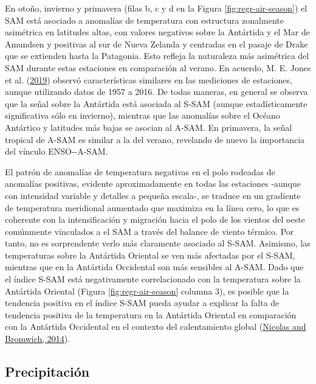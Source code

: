 \documentclass[12pt,oneside,a4paper]{reedthesis}
\begin{document}
En otoño, invierno y primavera (filas b, c y d en la Figura \ref{fig:regr-air-season}) el SAM está asociado a anomalías de temperatura con estructura zonalmente asimétrica en latitudes altas, con valores negativos sobre la Antártida y el Mar de Amundsen y positivas al sur de Nueva Zelanda y centradas en el pasaje de Drake que se extienden hasta la Patagonia.
Esto refleja la naturaleza más asimétrica del SAM durante estas estaciones en comparación al verano.
En acuerdo, M. E. Jones et al. (\protect\hyperlink{ref-jones2019}{2019}) observó características similares en las mediciones de estaciones, aunque utilizando datos de 1957 a 2016.
De todas maneras, en general se observa que la señal sobre la Antártida está asociada al S-SAM (aunque estadísticamente significativa sólo en invierno), mientras que las anomalías sobre el Océano Antártico y latitudes más bajas se asocian al A-SAM.
En primavera, la señal tropical de A-SAM es similar a la del verano, revelando de nuevo la importancia del vínculo ENSO-\/-A-SAM.

El patrón de anomalías de temperatura negativas en el polo rodeadas de anomalías positivas, evidente aproximadamente en todas las estaciones -aunque con intensidad variable y detalles a pequeña escala-, se traduce en un gradiente de temperatura meridional aumentado que maximiza en la línea cero, lo que es coherente con la intensificación y migración hacia el polo de los vientos del oeste comúnmente vinculados a el SAM a través del balance de viento térmico.
Por tanto, no es sorprendente verlo más claramente asociado al S-SAM.
Asimismo, las temperaturas sobre la Antártida Oriental se ven más afectadas por el S-SAM, mientras que en la Antártida Occidental son más sensibles al A-SAM.
Dado que el índice S-SAM está negativamente correlacionado con la temperatura sobre la Antártida Oriental (Figura \ref{fig:regr-air-season} columna 3), es posible que la tendencia positiva en el índice S-SAM pueda ayudar a explicar la falta de tendencia positiva de la temperatura en la Antártida Oriental en comparación con la Antártida Occidental en el contexto del calentamiento global (\protect\hyperlink{ref-nicolas2014}{Nicolas and Bromwich, 2014}).

\hypertarget{precipitaciuxf3n}{%
\subsection{Precipitación}\label{precipitaciuxf3n}}
\end{document}

